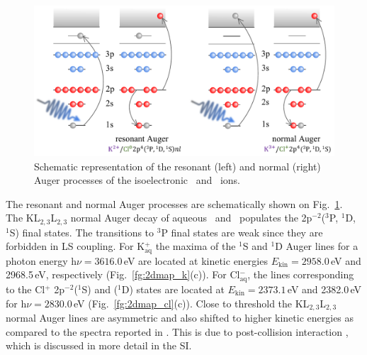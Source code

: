 \begin{figure}
\includegraphics[scale=0.8]{figures/auger_process.pdf}
\caption{Schematic representation of the resonant (left) and normal (right) Auger processes of the isoelectronic \ki~and \cli~ions.}
\label{fg:auger}
\end{figure}

The resonant and normal Auger processes are schematically shown on Fig.\ \ref{fg:auger}. The KL$_{2,3}$L$_{2,3}$ normal Auger decay of aqueous \ki~and \cli~populates the 2p$^{-2}$($^3$P, $^1$D, $^1$S) final states. The transitions to $^3$P final states are weak since they are forbidden in LS coupling. For K$^{+}_{\text{aq}}$ the maxima of the $^1$S and $^1$D Auger lines for a photon energy h$\nu = 3616.0$\,eV are located at kinetic energies $E_{\text{kin}} = 2958.0$\,eV and 2968.5\,eV, respectively (Fig.\ \ref{fg:2dmap_k}(c)). For Cl$^{-}_{\text{aq}}$, the lines corresponding to the Cl$^{+}$ 2p$^{-2}$($^1$S) and ($^1$D) states are located at $E_{\text{kin}} = 2373.1$\,eV and 2382.0\,eV for h$\nu = 2830.0$\,eV (Fig.\ \ref{fg:2dmap_cl}(c)). Close to threshold the KL$_{2,3}$L$_{2,3}$ normal Auger lines are asymmetric and also shifted to higher kinetic energies as compared to the spectra reported in \citep{ceolin17:263003}. This is due to post-collision interaction \citep{russek86:911,guillemin15:012503}, which is discussed in more detail in the SI.


